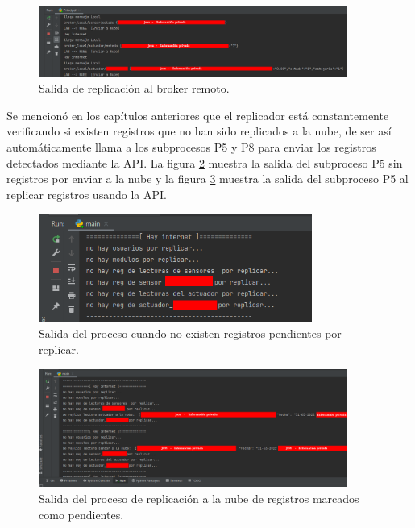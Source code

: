 \begin{figure}[htpb]
\centering 
\includegraphics[width=0.9\textwidth]{./Figures/test/replicador/enviabroker.png}
\caption{Salida de replicación al broker remoto.}
\label{fig:envia2}
\end{figure}

Se mencionó en los capítulos anteriores que el replicador está constantemente verificando si existen registros que no han sido replicados a la nube, de ser así automáticamente llama a los subprocesos P5 y P8 para enviar los registros detectados mediante la API. La figura \ref{fig:r1} muestra la salida del subproceso  P5 sin registros por enviar a la nube y la figura \ref{fig:r2} muestra la salida del subproceso P5 al replicar registros usando la API.


\begin{figure}[htpb]
\centering 
\includegraphics[width=0.8\textwidth]{./Figures/test/replicador/sinReplicar1.png}
\caption{Salida del proceso cuando no existen registros pendientes por replicar.}
\label{fig:r1}
\end{figure}

\begin{figure}[htpb]
\centering 
\includegraphics[width=0.9\textwidth]{./Figures/test/replicador/sinReplicar2.png}
\caption{Salida del proceso de replicación a la nube de registros marcados como pendientes.}
\label{fig:r2}
\end{figure}

